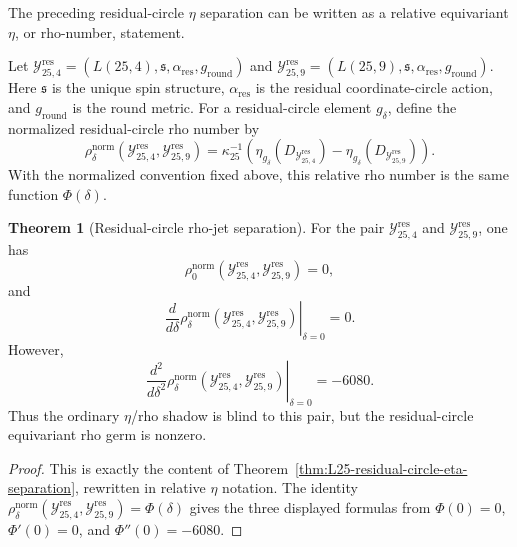 \documentclass{article}
\theoremstyle{definition}
\newtheorem{theorem}{Theorem}[section]
\numberwithin{equation}{section}
\begin{document}
The preceding residual-circle $\eta$ separation can be written as a relative equivariant $\eta$, or rho-number, statement.

Let $\mathcal Y^{\operatorname{res}}_{25,4}=(L(25,4),\mathfrak s,\alpha_{\text{res}},g_{\text{round}})$ and $\mathcal Y^{\operatorname{res}}_{25,9}=(L(25,9),\mathfrak s,\alpha_{\text{res}},g_{\text{round}})$.
Here $\mathfrak s$ is the unique spin structure, $\alpha_{\text{res}}$ is the residual coordinate-circle action, and $g_{\text{round}}$ is the round metric.  For a residual-circle element $g_\delta$, define the normalized residual-circle rho number by
\begin{equation}
\rho^{\text{norm}}_\delta(\mathcal Y^{\operatorname{res}}_{25,4},\mathcal Y^{\operatorname{res}}_{25,9})
=
\kappa_{25}^{-1}
\left(\eta_{g_\delta}(D_{\mathcal Y^{\operatorname{res}}_{25,4}})-\eta_{g_\delta}(D_{\mathcal Y^{\operatorname{res}}_{25,9}})\right).
\end{equation}
With the normalized convention fixed above, this relative rho number is the same function $\Phi(\delta)$.

\begin{theorem}[Residual-circle rho-jet separation]
\label{thm:residual-circle-rho-jet-separation}
For the pair $\mathcal Y^{\operatorname{res}}_{25,4}$ and $\mathcal Y^{\operatorname{res}}_{25,9}$, one has
\begin{equation}
\rho^{\text{norm}}_0(\mathcal Y^{\operatorname{res}}_{25,4},\mathcal Y^{\operatorname{res}}_{25,9})=0,
\end{equation}
and
\begin{equation}
\left.\frac{d}{d\delta}\rho^{\text{norm}}_\delta(\mathcal Y^{\operatorname{res}}_{25,4},\mathcal Y^{\operatorname{res}}_{25,9})\right|_{\delta=0}=0.
\end{equation}
However,
\begin{equation}
\left.\frac{d^2}{d\delta^2}\rho^{\text{norm}}_\delta(\mathcal Y^{\operatorname{res}}_{25,4},\mathcal Y^{\operatorname{res}}_{25,9})\right|_{\delta=0}=-6080.
\end{equation}
Thus the ordinary $\eta$/rho shadow is blind to this pair, but the residual-circle equivariant rho germ is nonzero.
\end{theorem}

\begin{proof}
This is exactly the content of Theorem~\ref{thm:L25-residual-circle-eta-separation}, rewritten in relative $\eta$ notation.  The identity $\rho^{\text{norm}}_\delta(\mathcal Y^{\operatorname{res}}_{25,4},\mathcal Y^{\operatorname{res}}_{25,9})=\Phi(\delta)$ gives the three displayed formulas from $\Phi(0)=0$, $\Phi'(0)=0$, and $\Phi''(0)=-6080$.
\end{proof}
\end{document}
